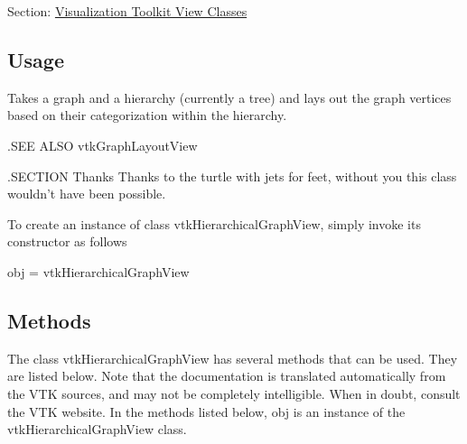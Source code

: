 Section\-: \hyperlink{sec_vtkviews}{Visualization Toolkit View Classes} \hypertarget{vtkwidgets_vtkxyplotwidget_Usage}{}\subsection{Usage}\label{vtkwidgets_vtkxyplotwidget_Usage}
Takes a graph and a hierarchy (currently a tree) and lays out the graph vertices based on their categorization within the hierarchy.

.S\-E\-E A\-L\-S\-O vtk\-Graph\-Layout\-View

.S\-E\-C\-T\-I\-O\-N Thanks Thanks to the turtle with jets for feet, without you this class wouldn't have been possible.

To create an instance of class vtk\-Hierarchical\-Graph\-View, simply invoke its constructor as follows \begin{DoxyVerb}  obj = vtkHierarchicalGraphView
\end{DoxyVerb}
 \hypertarget{vtkwidgets_vtkxyplotwidget_Methods}{}\subsection{Methods}\label{vtkwidgets_vtkxyplotwidget_Methods}
The class vtk\-Hierarchical\-Graph\-View has several methods that can be used. They are listed below. Note that the documentation is translated automatically from the V\-T\-K sources, and may not be completely intelligible. When in doubt, consult the V\-T\-K website. In the methods listed below, {\ttfamily obj} is an instance of the vtk\-Hierarchical\-Graph\-View class. 
